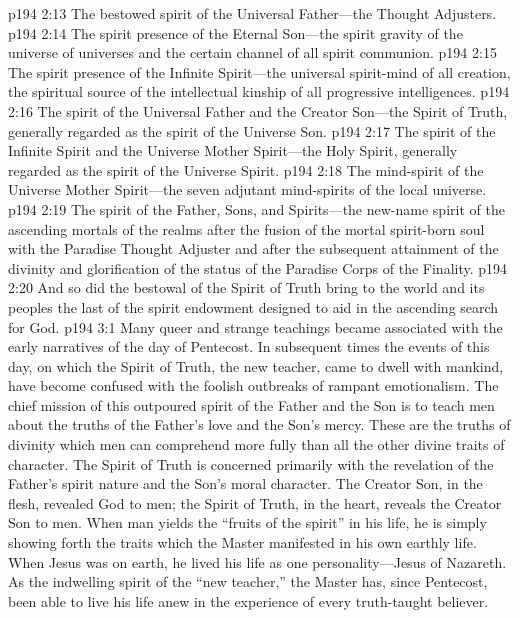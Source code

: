 \pc \vs p194 2:13 \bibnobreakspace The bestowed spirit of the Universal Father---the Thought Adjusters.
\pc \vs p194 2:14 \bibnobreakspace The spirit presence of the Eternal Son---the spirit gravity of the universe of universes and the certain channel of all spirit communion.
\pc \vs p194 2:15 \bibnobreakspace The spirit presence of the Infinite Spirit---the universal spirit\hyp{}mind of all creation, the spiritual source of the intellectual kinship of all progressive intelligences.
\pc \vs p194 2:16 \bibnobreakspace The spirit of the Universal Father and the Creator Son---the Spirit of Truth, generally regarded as the spirit of the Universe Son.\plusone
\pc \vs p194 2:17 \bibnobreakspace The spirit of the Infinite Spirit and the Universe Mother Spirit---the Holy Spirit, generally regarded as the spirit of the Universe Spirit.
\pc \vs p194 2:18 \bibnobreakspace The mind\hyp{}spirit of the Universe Mother Spirit---the seven adjutant mind\hyp{}spirits of the local universe.
\pc \vs p194 2:19 \bibnobreakspace The spirit of the Father, Sons, and Spirits---the new\hyp{}name spirit of the ascending mortals of the realms after the fusion of the mortal spirit\hyp{}born soul with the Paradise Thought Adjuster and after the subsequent attainment of the divinity and glorification of the status of the Paradise Corps of the Finality.
\pc \vs p194 2:20 And so did the bestowal of the Spirit of Truth bring to the world and its peoples the last of the spirit endowment designed to aid in the ascending search for God.
\vs p194 3:1 Many queer and strange teachings became associated with the early narratives of the day of Pentecost. In subsequent times the events of this day, on which the Spirit of Truth, the new teacher, came to dwell with mankind, have become confused with the foolish outbreaks of rampant emotionalism. The chief mission of this outpoured spirit of the Father and the Son is to teach men about the truths of the Father’s love and the Son’s mercy. These are the truths of divinity which men can comprehend more fully than all the other divine traits of character. The Spirit of Truth is concerned primarily with the revelation of the Father’s spirit nature and the Son’s moral character. The Creator Son, in the flesh, revealed God to men; the Spirit of Truth, in the heart, reveals the Creator Son to men. When man yields the “fruits of the spirit” in his life, he is simply showing forth the traits which the Master manifested in his own earthly life. When Jesus was on earth, he lived his life as one personality---Jesus of Nazareth. As the indwelling spirit of the “new teacher,” the Master has, since Pentecost, been able to live his life anew in the experience of every truth\hyp{}taught believer.
